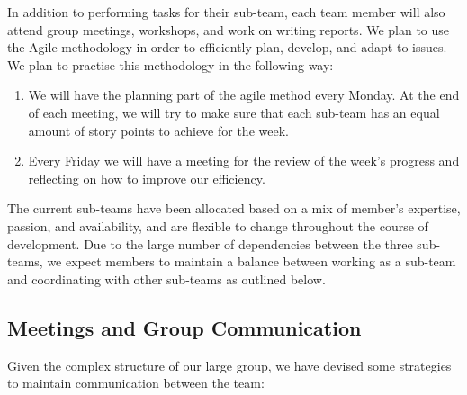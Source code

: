 \documentclass{article}
\begin{document}
In addition to performing tasks for their sub-team, each team member will also attend group meetings, workshops, and work on writing reports. We plan to use the Agile methodology in order to efficiently plan, develop, and adapt to issues. We plan to practise this methodology in the following way: 
\begin{enumerate}
    \itemsep0em
    \item We will have the planning part of the agile method every Monday. At the end of each meeting, we will try to make sure that each sub-team has an equal amount of story points to achieve for the week. 
    \item Every Friday we will have a meeting for the review of the week's progress and reflecting on how to improve our efficiency. 
\end{enumerate}
The current sub-teams have been allocated based on a mix of member’s expertise, passion, and availability, and are flexible to change throughout the course of development. Due to the large number of dependencies between the three sub-teams, we expect members to maintain a balance between working as a sub-team and coordinating with other sub-teams as outlined below. 

\subsection{Meetings and Group Communication}

Given the complex structure of our large group, we have devised some strategies to maintain communication between the team:
\end{document}
